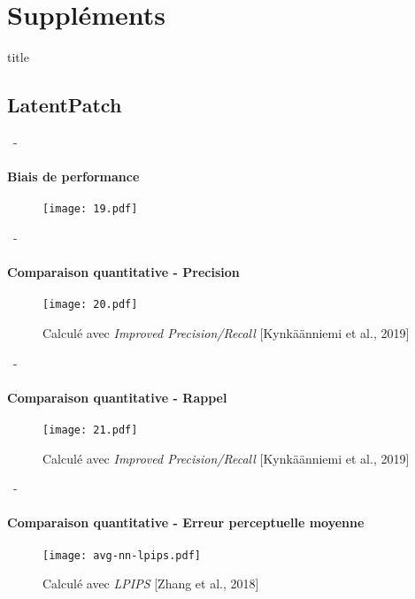 \documentclass[aspectratio=169, 22pt]{beamer}
\begin{document}
\makethanks

\section{Suppléments}
\begin{frame}[noframenumbering]
  \begin{beamercolorbox}[sep=15pt,center,shadow=true,rounded=true]{title}
    \LARGE\bfseries \secname
  \end{beamercolorbox}
\end{frame}


\subsection{LatentPatch}
\begin{frame}[noframenumbering]{\secname~- \subsecname}
  \framesubtitle{Biais de performance}
  \begin{figure}
    \centering
    \texttt{[image: 19.pdf]}
  \end{figure}
\end{frame}

\begin{frame}[noframenumbering]{\secname~- \subsecname}
  \framesubtitle{Comparaison quantitative - Precision}
  \begin{figure}
    \texttt{[image: 20.pdf]}
    \caption{\small Calculé avec \emph{Improved Precision/Recall} [Kynkäänniemi et al., 2019]}
  \end{figure}
\end{frame}

\begin{frame}[noframenumbering]{\secname~- \subsecname}
  \framesubtitle{Comparaison quantitative - Rappel}
  \begin{figure}
    \texttt{[image: 21.pdf]}
    \caption{\small Calculé avec \emph{Improved Precision/Recall} [Kynkäänniemi et al., 2019]}
  \end{figure}
\end{frame}

\begin{frame}[noframenumbering]{\secname~- \subsecname}
  \framesubtitle{Comparaison quantitative - Erreur perceptuelle moyenne}
  \begin{figure}
    \texttt{[image: avg-nn-lpips.pdf]}
    \caption{\small Calculé avec \emph{LPIPS} [Zhang et al., 2018]}
  \end{figure}
\end{frame}
\end{document}
